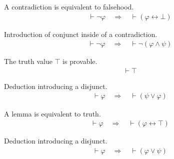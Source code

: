 \begin{lemma} A contradiction is equivalent to falsehood. 
\begin{align}
\vdash \lnot \varphi\quad\Rightarrow\quad \vdash ( \varphi \leftrightarrow \bot
    )\label{eq:bifal}\tag{bifal}
\end{align}
\end{lemma}


\begin{lemma} Introduction of conjunct inside of a
contradiction.  
\begin{align}
\vdash \lnot \varphi\quad\Rightarrow\quad \vdash \lnot ( \varphi \wedge \psi
    )\label{eq:intnanr}\tag{intnanr}
\end{align}
\end{lemma}


\begin{lemma} The truth value $\top$ is provable. 
\begin{align}
\vdash \top\label{eq:tru}\tag{tru}
\end{align}
\end{lemma}


\begin{lemma} Deduction introducing a disjunct. 
\begin{align}
\vdash \varphi\quad\Rightarrow\quad \vdash ( \psi \vee \varphi
    )\label{eq:olci}\tag{olci}
\end{align}
\end{lemma}


\begin{lemma} A lemma is equivalent to truth. 
\begin{align}
\vdash \varphi\quad\Rightarrow\quad \vdash ( \varphi \leftrightarrow \top
    )\label{eq:bitru}\tag{bitru}
\end{align}
\end{lemma}


\begin{lemma} Deduction introducing a disjunct. 
\begin{align}
\vdash \varphi\quad\Rightarrow\quad \vdash ( \varphi \vee \psi
    )\label{eq:orci}\tag{orci}
\end{align}
\end{lemma}



